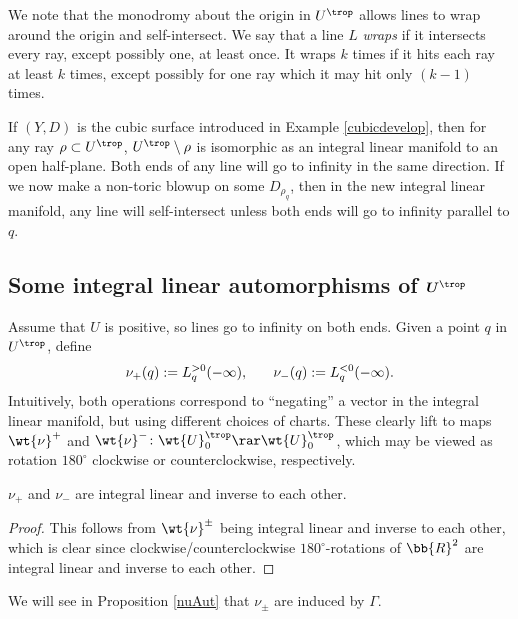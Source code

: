 We note that the monodromy about the origin in $U^{\trop}$ allows lines to wrap around the origin and self-intersect. We say that a line $L$ {\it wraps} if it intersects every ray, except possibly one, at least once. It wraps $k$ times if it hits each ray at least $k$ times, except possibly for one ray which it may hit only $(k-1)$ times.

\begin{eg} If $(Y,D)$ is the cubic surface introduced in Example \ref{cubicdevelop}, then for any ray $\rho \subset {U^{\trop}}$, $U^{\trop}\setminus \rho$ is isomorphic as an integral linear manifold to an open half-plane. Both ends of any line will go to infinity in the same direction. If we now make a non-toric blowup on some $D_{\rho_q}$, then in the new integral linear manifold, any line will self-intersect unless both ends will go to infinity parallel to $q$.
\end{eg}

\subsection[Some integral linear automorphisms of $U^{\trop}$]{Some integral linear automorphisms of $\boldsymbol{U^{\trop}}$}\label{LinearAuts}

Assume that $U$ is positive, so lines go to infinity on both ends. Given a point $q$ in $U^{\trop}$, define
\begin{gather*}
	\nu_+(q):=L_q^{>0}(-\infty), \hspace{.25 in} \nu_-(q):=L_q^{<0}(-\infty).
\end{gather*}
Intuitively, both operations correspond to ``negating'' a vector in the integral linear manifold, but using different choices of charts. These clearly lift to maps $\wt{\nu}^+$ and $\wt{\nu}^-\colon \wt{U}_0^{\trop}\rar \wt{U}_0^{\trop}$, which may be viewed as rotation $180^{\circ}$ clockwise or counterclockwise, respectively.

\begin{lem}\label{nu}$\nu_+$ and $\nu_-$ are integral linear and inverse to each other.
\end{lem}
\begin{proof}
This follows from $\wt{\nu}^{\pm}$ being integral linear and inverse to each other, which is clear since clockwise/counterclockwise $180^{\circ}$-rotations of $\bb{R}^2$ are integral linear and inverse to each other.
\end{proof}

We will see in Proposition \ref{nuAut} that $\nu_{\pm}$ are induced by $\Gamma$.


